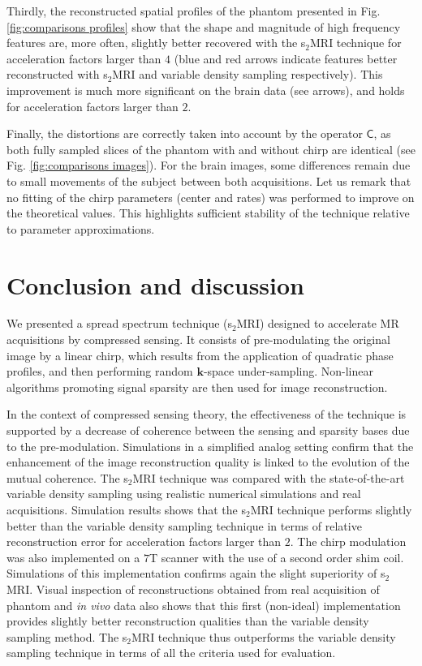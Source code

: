 \documentclass[10pt,draftcls, onecolumn]{IEEEtran}
\begin{document}
Thirdly, the reconstructed spatial profiles of the phantom presented in Fig. \ref{fig:comparisons profiles} show that the shape and magnitude of high frequency features are, more often, slightly better recovered with the s$_2$MRI technique for acceleration factors larger than $4$ (blue and red arrows indicate features better reconstructed with s$_2$MRI and variable density sampling respectively). This improvement is much more significant on the brain data (see arrows), and holds for acceleration factors larger than $2$.

Finally, the distortions are correctly taken into account by the operator $\mathsf{C}$, as both fully sampled slices of the phantom with and without chirp are identical (see Fig. \ref{fig:comparisons images}). For the brain images, some differences remain due to small movements of the subject between both acquisitions. Let us remark that no fitting of the chirp parameters (center and rates) was performed to improve on the theoretical values. This highlights sufficient stability of the technique relative to parameter approximations.

\section{Conclusion and discussion}
\label{sec:Conclusion}

We presented a spread spectrum technique (s$_2$MRI) designed to accelerate MR acquisitions by compressed sensing. It consists of pre-modulating the original image by a linear chirp, which results from the application of quadratic phase profiles, and then performing random $\bm k$-space under-sampling. Non-linear algorithms promoting signal sparsity are then used for image reconstruction.

In the context of compressed sensing theory, the effectiveness of the technique is supported by a decrease of coherence between the sensing and sparsity bases due to the pre-modulation. Simulations in a simplified analog setting confirm that the enhancement of the image reconstruction quality is linked to the evolution of the mutual coherence. The s$_2$MRI technique was compared with the state-of-the-art variable density sampling using realistic numerical simulations and real acquisitions. Simulation results shows that the s$_2$MRI technique performs slightly better than the variable density sampling technique in terms of relative reconstruction error for acceleration factors larger than $2$. The chirp modulation was also implemented on a $7$T scanner with the use of a second order shim coil. Simulations of this implementation confirms again the slight superiority of s$_2$MRI. Visual inspection of reconstructions obtained from real acquisition of phantom and \emph{in vivo} data also shows that this first (non-ideal) implementation provides slightly better reconstruction qualities than the variable density sampling method. The s$_2$MRI technique thus outperforms the variable density sampling technique in terms of all the criteria used for evaluation.
\end{document}

